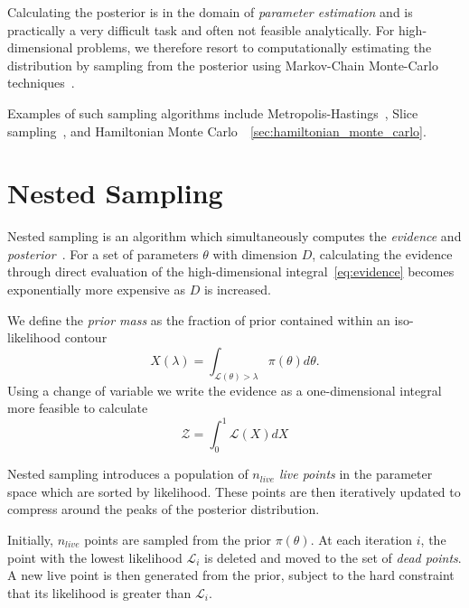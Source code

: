 \documentclass[11pt]{article}
\begin{document}
    Calculating the posterior is in the domain of \emph{parameter estimation} and is practically a very difficult task
    and often not feasible analytically.
    For high-dimensional problems, we therefore resort to computationally estimating the distribution by sampling
    from the posterior using Markov-Chain Monte-Carlo techniques~\cite{gupta2014comparison, delmoral2013mean}.

    Examples of such sampling algorithms include Metropolis-Hastings~\cite{Metropolis_OG},
    Slice sampling~\cite{neal2003slice}, and Hamiltonian Monte Carlo~\cite{HMC_Duane, neal1996monte}~\ref{sec:hamiltonian_monte_carlo}.

    \section{Nested Sampling}\label{sec:nested_sampling}
    Nested sampling is an algorithm which simultaneously computes
    the \emph{evidence} and \emph{posterior}~\cite{Skilling2006, Handley_polychord, NS_Review_2022}.
    For a set of parameters $\theta$ with dimension $D$, calculating the evidence through direct evaluation of the
    high-dimensional integral~\ref{eq:evidence} becomes exponentially more expensive as $D$ is increased.

    We define the \emph{prior mass} as the fraction of prior contained within an iso-likelihood contour
    \begin{equation}\label{eq:prior_mass}
        X(\lambda) = \int_{\mathcal{L}(\theta)>\lambda} \pi(\theta) d\theta.
    \end{equation}
    Using a change of variable we write the evidence as a one-dimensional integral more feasible to calculate
    \begin{equation}\label{eq:evidence_ns}
        \mathcal{Z} = \int_0^1 {\mathcal{L}(X)} dX
    \end{equation}

    Nested sampling introduces a population of $n_{live}$ \emph{live points} in the parameter space which are sorted
    by likelihood.
    These points are then iteratively updated to compress around the peaks of the posterior distribution.

    Initially, $n_{live}$ points are sampled from the prior $\pi(\theta)$.
    At each iteration $i$, the point with the lowest likelihood $\mathcal{L}_i$ is deleted and moved to the set
    of \emph{dead points}.
    A new live point is then generated from the prior, subject to the hard constraint that its likelihood is
    greater than $\mathcal{L}_i$.
\end{document}
